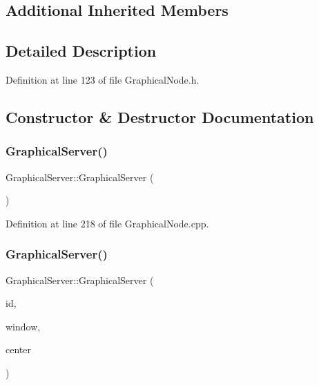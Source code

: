 \subsection*{Additional Inherited Members}


\subsection{Detailed Description}


Definition at line 123 of file Graphical\+Node.\+h.



\subsection{Constructor \& Destructor Documentation}
\mbox{\label{class_graphical_server_a676ae0f9427d8dae12256c6203127541}} 
\subsubsection{\texorpdfstring{Graphical\+Server()}{GraphicalServer()}\hspace{0.1cm}{\footnotesize\ttfamily [1/2]}}
{\footnotesize\ttfamily Graphical\+Server\+::\+Graphical\+Server (\begin{DoxyParamCaption}{ }\end{DoxyParamCaption})}



Definition at line 218 of file Graphical\+Node.\+cpp.

\mbox{\label{class_graphical_server_a2690b914b1876f1eded21c1601803e93}} 
\subsubsection{\texorpdfstring{Graphical\+Server()}{GraphicalServer()}\hspace{0.1cm}{\footnotesize\ttfamily [2/2]}}
{\footnotesize\ttfamily Graphical\+Server\+::\+Graphical\+Server (\begin{DoxyParamCaption}\item[{\hyperlink{_graphical_element_8h_ade5fd6c85839a416577ff9de1605141e}{Element\+Key}}]{id,  }\item[{wx\+Window $\ast$}]{window,  }\item[{wx\+Point2\+D\+Double}]{center }\end{DoxyParamCaption})}



